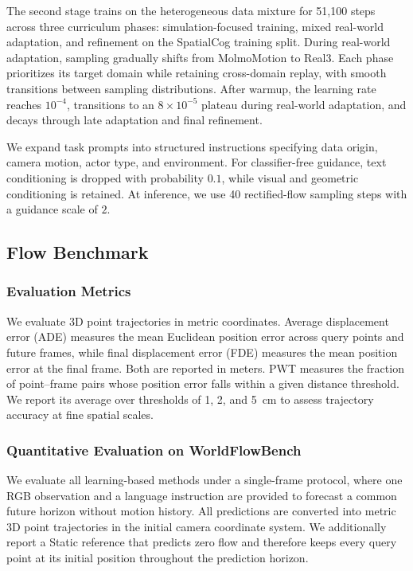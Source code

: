 The second stage trains on the heterogeneous data mixture
for 51,100 steps across three curriculum phases:
simulation-focused training, mixed real-world adaptation,
and refinement on the SpatialCog training split.
During real-world adaptation, sampling gradually shifts
from MolmoMotion to Real3.
Each phase prioritizes its target domain while retaining
cross-domain replay, with smooth transitions between
sampling distributions.
After warmup, the learning rate reaches $10^{-4}$,
transitions to an $8\times10^{-5}$ plateau during
real-world adaptation, and decays through late adaptation
and final refinement.

We expand task prompts into structured instructions
specifying data origin, camera motion, actor type,
and environment.
For classifier-free guidance, text conditioning is
dropped with probability $0.1$, while visual and
geometric conditioning is retained.
At inference, we use 40 rectified-flow sampling steps
with a guidance scale of $2$.



\subsection{Flow Benchmark}

\subsubsection{Evaluation Metrics}
We evaluate 3D point trajectories in metric coordinates.
Average displacement error (ADE) measures the mean
Euclidean position error across query points and future
frames, while final displacement error (FDE) measures
the mean position error at the final frame.
Both are reported in meters.
PWT measures the fraction of point--frame pairs whose
position error falls within a given distance threshold.
We report its average over thresholds of 1, 2, and 5~cm
to assess trajectory accuracy at fine spatial scales.

\subsubsection{Quantitative Evaluation on WorldFlowBench}
\label{sec:worldflowbench_eval}

We evaluate all learning-based methods under a single-frame
protocol, where one RGB observation and a language instruction
are provided to forecast a common future horizon without motion
history. All predictions are converted into metric 3D point
trajectories in the initial camera coordinate system. We
additionally report a Static reference that predicts zero flow
and therefore keeps every query point at its initial position
throughout the prediction horizon.

